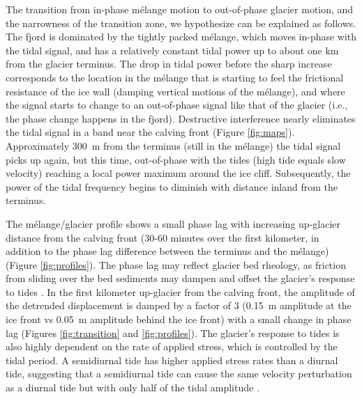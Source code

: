 \documentclass[review]{igs}
\begin{document}
The transition from in-phase m\'elange motion to out-of-phase glacier motion, and the narrowness of the transition zone, we hypothesize can be explained as follows. The fjord is dominated by the tightly packed m\'elange, which moves in-phase with the tidal signal, and has a relatively constant tidal power up to about one km from the glacier terminus. The drop in tidal power before the sharp increase corresponds to the  location in the m\'elange that is starting to feel the frictional resistance of the ice wall (damping vertical motions of the m\'elange), and where the signal starts to change to an out-of-phase signal like that of the glacier (i.e., the phase change happens in the fjord). Destructive interference nearly eliminates the tidal signal in a band near the calving front (Figure \ref{fig:maps}).  Approximately 300~m from the terminus (still in the m\'elange) the tidal signal picks up again, but this time, out-of-phase with the tides (high tide equals slow velocity) reaching a local power maximum around the ice cliff.  Subsequently, the power of the tidal frequency begins to diminish with distance inland from the terminus. 


The m\'elange/glacier profile shows a small phase lag with increasing up-glacier
distance from the calving front (30-60 minutes over the first
kilometer, in addition to the phase lag difference between the terminus and the m\'elange) (Figure \ref{fig:profiles}). The phase lag may reflect glacier bed rheology,
as friction from sliding over the bed sediments may dampen and offset
the glacier's response to tides \citep{walker2014ice}. 
In the first kilometer up-glacier from the calving front, the amplitude of the detrended displacement is damped by a factor of 3 (0.15~m amplitude at the ice front vs 0.05~m amplitude behind the ice front) with a small change in phase lag (Figures \ref{fig:transition} and \ref{fig:profiles}). The glacier's response to tides is also highly
dependent on the rate of applied stress, which is controlled by the
tidal period. A semidiurnal tide has higher applied stress rates than
a diurnal tide, suggesting that a semidiurnal tide can cause the same velocity perturbation as a diurnal tide but with only half of the tidal amplitude \citep{walker2014ice}.
  
\end{document}
